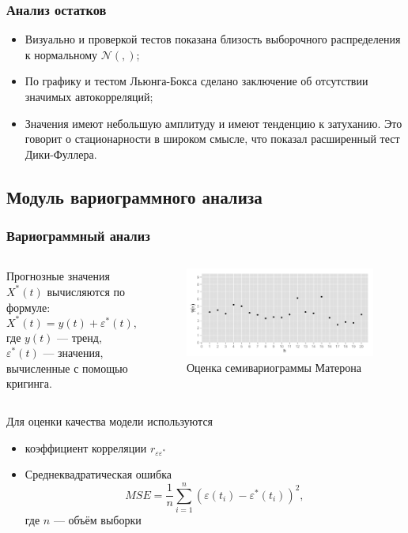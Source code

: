 \documentclass[notheorems]{beamer}
\theoremstyle{definition}
\theoremstyle{example}
\theoremstyle{plain}
\newcommand{\inp}[1]{}
\newcommand{\descriptive}[2]{\inp{#1/descriptive/#2}}
\newcommand{\resnormaldistr}{$\mathcal{N}(\descriptive{residual}{mean}, \descriptive{residual}{variance})$}
\begin{document}
\begin{frame}
  \frametitle{Анализ остатков}
  \begin{itemize}
    \item Визуально и проверкой тестов показана близость выборочного распределения к нормальному \resnormaldistr;
    \item По графику и тестом Льюнга-Бокса сделано заключение об отсутствии значимых автокорреляций;
    \item Значения имеют небольшую амплитуду и имеют тенденцию к затуханию. Это говорит о стационарности в широком смысле, что показал расширенный тест Дики-Фуллера.
  \end{itemize}
\end{frame}

\subsection{Модуль вариограммного анализа}

\begin{frame}
  \frametitle{Вариограммный анализ}
  \begin{columns}[c]
    Прогнозные значения $ X^{*}(t) $ вычисляются по формуле:
    \begin{equation*}
      X^{*}(t) = y(t) + \varepsilon^{*}(t),
    \end{equation*}
    где $ y(t) $ --- тренд, $ \varepsilon^{*}(t) $ --- значения, вычисленные с помощью кригинга.

    \begin{figure}[h]
    \includegraphics[width=1\linewidth]{../../figures/variogram/lin-variogram.png}
    \caption{Оценка семивариограммы Матерона}
  \end{figure}
  \end{columns}
  
  \vspace{1em}
  
  Для оценки качества модели используются
  \begin{itemize}
    \item коэффициент корреляции $ r_{\varepsilon\varepsilon^{*}} $
    \item Среднеквадратическая ошибка
    \begin{equation}
      \label{eq:mse}
      MSE = \frac{1}{n} \sum_{i=1}^{n} (\varepsilon(t_i) - \varepsilon^{*}(t_i))^2,
    \end{equation}
    где $ n $ --- объём выборки
  \end{itemize}
\end{frame}
\end{document}
